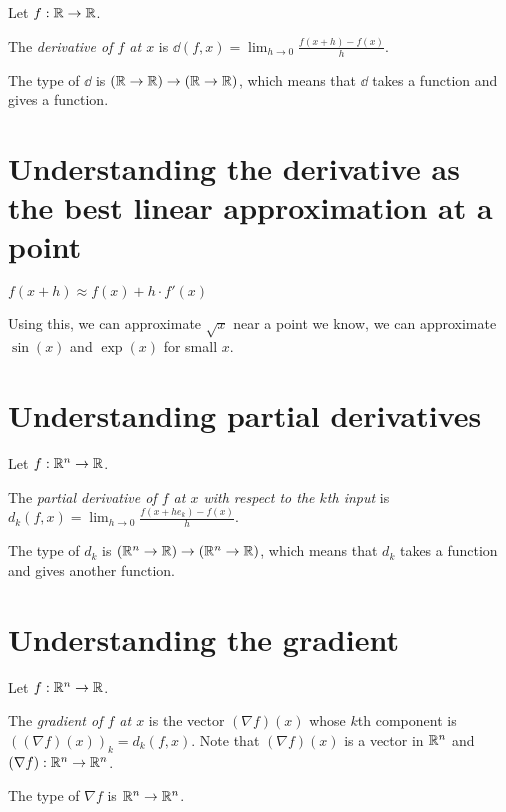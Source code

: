 Let \( f : \mathbb{R} \to \mathbb{R} \).

%
The \emph{derivative of \( f \) at \(x\)} is \( \dd(f,x) = \lim_{h \to 0} \frac{f(x+h) - f(x)}{h} \).

The type of \(\dd\) is \( (\mathbb{R} \to \mathbb{R}) \to (\mathbb{R} \to \mathbb{R}) \),
which means that \(\dd\) takes a function and gives a function.

\section{Understanding the derivative as the best linear approximation at a point}

\( f(x+h) \approx f(x) + h \cdot f'(x) \)

Using this, we can approximate \(\sqrt{x}\) near a point we know,
we can approximate \(\sin(x)\) and \(\exp(x)\) for small \(x\).

\section{Understanding partial derivatives}


Let \( f : \mathbb{R}^n \to \mathbb{R} \).

%
The \emph{partial derivative of \(f\) at \( x \) with respect to the \(k\)th input}
is \( d_k(f,x) = \lim_{h \to 0} \frac{f(x + h e_k) - f(x)}{h} \).

The type of \(d_k\) is \((\mathbb{R}^n \to \mathbb{R}) \to (\mathbb{R}^n \to \mathbb{R})\),
which means that \( d_k \) takes a function and gives another function.

\section{Understanding the gradient}

Let \(f : \mathbb{R}^n \to \mathbb{R}\).

%
The \emph{gradient of \(f\) at \(x\)} is the vector \( (\nabla f)(x) \) whose \(k\)th component is \( ((\nabla f)(x))_k = d_k(f,x) \).
Note that \( (\nabla f)(x) \) is a vector in \( \mathbb{R}^n \) and \( (\nabla f) : \mathbb{R}^n \to \mathbb{R}^n \).

The type of \(\nabla f\) is \(\mathbb{R}^n \to \mathbb{R}^n\).

